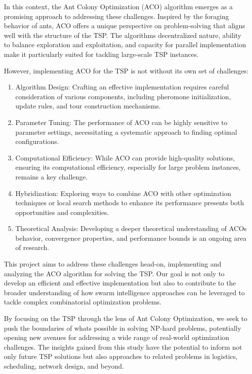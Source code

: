 \documentclass[
]{article}
\begin{document}
In this context, the Ant Colony Optimization (ACO) algorithm emerges as
a promising approach to addressing these challenges. Inspired by the
foraging behavior of ants, ACO offers a unique perspective on
problem-solving that aligns well with the structure of the TSP. The
algorithm\textquotesingle s decentralized nature, ability to balance
exploration and exploitation, and capacity for parallel implementation
make it particularly suited for tackling large-scale TSP instances.

However, implementing ACO for the TSP is not without its own set of
challenges:

\begin{enumerate}
\def\labelenumi{\arabic{enumi}.}
\item
  Algorithm Design: Crafting an effective implementation requires
  careful consideration of various components, including pheromone
  initialization, update rules, and tour construction mechanisms.
\item
  Parameter Tuning: The performance of ACO can be highly sensitive to
  parameter settings, necessitating a systematic approach to finding
  optimal configurations.
\item
  Computational Efficiency: While ACO can provide high-quality
  solutions, ensuring its computational efficiency, especially for large
  problem instances, remains a key challenge.
\item
  Hybridization: Exploring ways to combine ACO with other optimization
  techniques or local search methods to enhance its performance presents
  both opportunities and complexities.
\item
  Theoretical Analysis: Developing a deeper theoretical understanding of
  ACO\textquotesingle s behavior, convergence properties, and
  performance bounds is an ongoing area of research.
\end{enumerate}

This project aims to address these challenges head-on, implementing and
analyzing the ACO algorithm for solving the TSP. Our goal is not only to
develop an efficient and effective implementation but also to contribute
to the broader understanding of how swarm intelligence approaches can be
leveraged to tackle complex combinatorial optimization problems.

By focusing on the TSP through the lens of Ant Colony Optimization, we
seek to push the boundaries of what\textquotesingle s possible in
solving NP-hard problems, potentially opening new avenues for addressing
a wide range of real-world optimization challenges. The insights gained
from this study have the potential to inform not only future TSP
solutions but also approaches to related problems in logistics,
scheduling, network design, and beyond.
\end{document}
